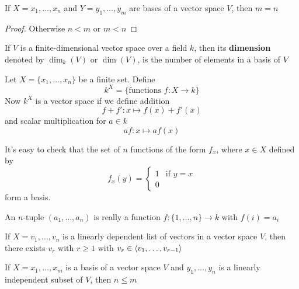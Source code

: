 \documentclass[11pt]{article}
\begin{document}
\begin{theorem}
If \(X=x_1,\dots,x_n\) and \(Y=y_1,\dots,y_m\) are bases of a vector space
\(V\), then \(m=n\)
\end{theorem}

\begin{proof}
Otherwise \(n<m\) or \(m<n\)
\end{proof}

\begin{definition}[]
If \(V\) is a finite-dimensional vector space over a field \(k\), then its
\textbf{dimension} denoted by \(\dim_k(V)\) or \(\dim(V)\), is the number of elements
in a basis of \(V\)
\end{definition}

\begin{examplle}[]
Let \(X=\{x_1,\dots,x_n\}\) be a finite set. Define
\begin{equation*}
k^X=\{\text{functions }f:X\to k\}
\end{equation*}
Now \(k^X\) is a vector space if we define addition
\begin{equation*}
f+f':x\mapsto f(x)+f'(x)
\end{equation*}
and scalar multiplication for \(a\in k\)
\begin{equation*}
af:x\mapsto af(x)
\end{equation*}

It's easy to check that the set of \(n\) functions of the form \(f_x\),
where \(x\in X\) defined by
\begin{equation*}
f_x(y)=
\begin{cases}
1&\text{if }y=x\\
0
\end{cases}
\end{equation*}
form a basis.

An \(n\)-tuple \((a_1,\dots,a_n)\) is really a function \(f:\{1,\dots,n\}\to
    k\) with \(f(i)=a_i\)
\end{examplle}

\begin{lemma}[]
\label{lemma3.73}
If \(X=v_1,\dots,v_n\) is a linearly dependent list of vectors in a vector
space \(V\), then there exists \(v_r\) with \(r\ge1\) with \(v_r\in\langle v_1,\dots,v_{r-1}\rangle\)
\end{lemma}

\begin{lemma}
\label{lemma3.74}
If \(X=x_1,\dots,x_m\) is a basis of a vector space \(V\) and
\(y_1,\dots,y_n\) is a linearly independent subset of \(V\), then \(n\le m\)
\end{lemma}
\end{document}
